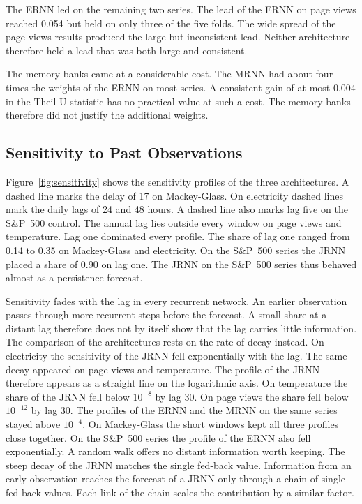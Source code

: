 \documentclass[conference,10pt]{IEEEtran}
\begin{document}
The ERNN led on the remaining two series.
The lead of the ERNN on page views reached 0.054 but held on only three
of the five folds.
The wide spread of the page views results produced the large but
inconsistent lead.
Neither architecture therefore held a lead that was both large and
consistent.

The memory banks came at a considerable cost.
The MRNN had about four times the weights of the ERNN on most series.
A consistent gain of at most 0.004 in the Theil U statistic has no
practical value at such a cost.
The memory banks therefore did not justify the additional weights.

\subsection{Sensitivity to Past Observations}

Figure~\ref{fig:sensitivity} shows the sensitivity profiles of the three
architectures.
A dashed line marks the delay of 17 on Mackey-Glass.
On electricity dashed lines mark the daily lags of 24 and 48 hours.
A dashed line also marks lag five on the S\&P~500 control.
The annual lag lies outside every window on page views and temperature.
Lag one dominated every profile.
The share of lag one ranged from 0.14 to 0.35 on Mackey-Glass and
electricity.
On the S\&P~500 series the JRNN placed a share of 0.90 on lag one.
The JRNN on the S\&P~500 series thus behaved almost as a persistence
forecast.

Sensitivity fades with the lag in every recurrent network.
An earlier observation passes through more recurrent steps before the
forecast.
A small share at a distant lag therefore does not by itself show that
the lag carries little information.
The comparison of the architectures rests on the rate of decay instead.
On electricity the sensitivity of the JRNN fell exponentially with the
lag.
The same decay appeared on page views and temperature.
The profile of the JRNN therefore appears as a straight line on the
logarithmic axis.
On temperature the share of the JRNN fell below $10^{-8}$ by lag 30.
On page views the share fell below $10^{-12}$ by lag 30.
The profiles of the ERNN and the MRNN on the same series stayed above
$10^{-4}$.
On Mackey-Glass the short windows kept all three profiles close
together.
On the S\&P~500 series the profile of the ERNN also fell exponentially.
A random walk offers no distant information worth keeping.
The steep decay of the JRNN matches the single fed-back value.
Information from an early observation reaches the forecast of a JRNN
only through a chain of single fed-back values.
Each link of the chain scales the contribution by a similar factor.
\end{document}
